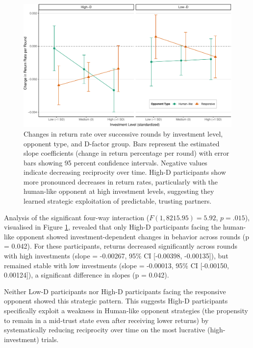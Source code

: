 \documentclass[
]{article}
\begin{document}
\begin{figure}

{\centering \includegraphics[width=\textwidth]{article_files/figure-latex/oppExploit-1} 

}

\caption{Changes in return rate over successive rounds by investment level, opponent type, and D-factor group. Bars represent the estimated slope coefficients (change in return percentage per round) with error bars showing 95 percent confidence intervals. Negative values indicate decreasing reciprocity over time. High-D participants show more pronounced decreases in return rates, particularly with the human-like opponent at high investment levels, suggesting they learned strategic exploitation of predictable, trusting partners.}\label{fig:oppExploit}
\end{figure}

Analysis of the significant four-way interaction (\(F(1, 8215.95) = 5.92\), \(p = .015\)), visualised in Figure \ref{fig:oppExploit}, revealed that only High-D participants facing the human-like opponent showed investment-dependent changes in behavior across rounds (p = 0.042). For these participants, returns decreased significantly across rounds with high investments (slope = -0.00267, 95\% CI {[}-0.00398, -0.00135{]}), but remained stable with low investments (slope = -0.00013, 95\% CI {[}-0.00150, 0.00124{]}), a significant difference in slopes (p = 0.042).

Neither Low-D participants nor High-D participants facing the responsive opponent showed this strategic pattern. This suggests High-D participants specifically exploit a weakness in Human-like opponent strategies (the propensity to remain in a mid-trust state even after receiving lower returns) by systematically reducing reciprocity over time on the most lucrative (high-investment) trials.
\end{document}
